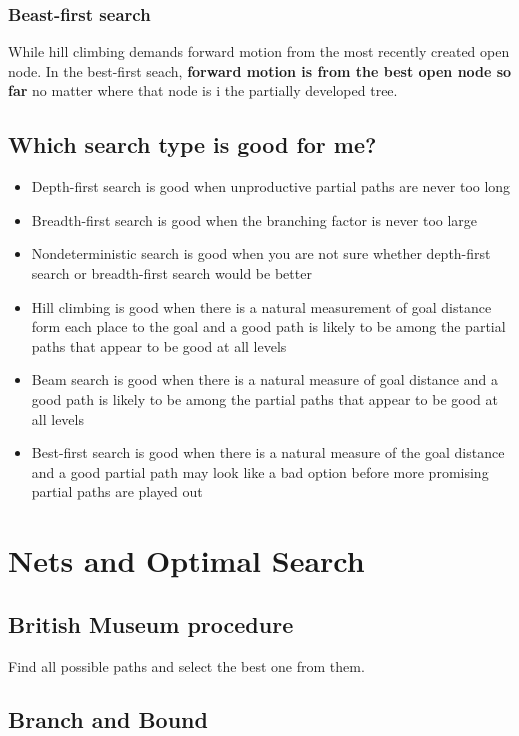 \documentclass{article}
\begin{document}
\subsubsection{Beast-first search}

While hill climbing demands forward motion from the most recently created
open node. In the best-first seach, \textbf{forward motion is 
from the best open node so far} no matter where that node is i the
partially developed tree.

\subsection{Which search type is good for me?}
\begin{itemize}
  \item Depth-first search is good when unproductive partial
    paths are never too long
  \item Breadth-first search is good when the branching 
    factor is never too large
  \item Nondeterministic search is good when you are not sure whether
    depth-first search or breadth-first search would be better
  \item Hill climbing is good when there is a natural measurement
    of goal distance form each place to the goal and a good path is 
    likely to be among the partial paths that appear to be good at
    all levels
  \item Beam search is good when there is a natural measure of
    goal distance and a good path is likely to be among the 
    partial paths that appear to be good at all levels
  \item Best-first search is good when there is a natural measure 
    of the goal distance and a good partial path may look like
    a bad option before more promising partial paths are played
    out
\end{itemize}

\section{Nets and Optimal Search}

\subsection{British Museum procedure}

Find all possible paths and select the best one from them.

\subsection{Branch and Bound}
\end{document}
